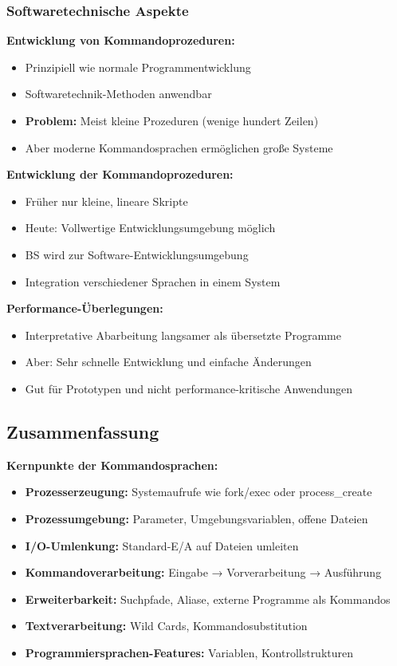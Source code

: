 \documentclass[9pt,a4paper]{extarticle}
\begin{document}
\begin{multicols*}{2}
\subsubsection{Softwaretechnische Aspekte}
\textbf{Entwicklung von Kommandoprozeduren:}
\begin{itemize}
\item Prinzipiell wie normale Programmentwicklung
\item Softwaretechnik-Methoden anwendbar
\item \textbf{Problem:} Meist kleine Prozeduren (wenige hundert Zeilen)
\item Aber moderne Kommandosprachen ermöglichen große Systeme
\end{itemize}

\textbf{Entwicklung der Kommandoprozeduren:}
\begin{itemize}
\item Früher nur kleine, lineare Skripte
\item Heute: Vollwertige Entwicklungsumgebung möglich
\item BS wird zur Software-Entwicklungsumgebung
\item Integration verschiedener Sprachen in einem System
\end{itemize}

\textbf{Performance-Überlegungen:}
\begin{itemize}
\item Interpretative Abarbeitung langsamer als übersetzte Programme
\item Aber: Sehr schnelle Entwicklung und einfache Änderungen
\item Gut für Prototypen und nicht performance-kritische Anwendungen
\end{itemize}

\subsection{Zusammenfassung}
\textbf{Kernpunkte der Kommandosprachen:}
\begin{itemize}
\item \textbf{Prozesserzeugung:} Systemaufrufe wie fork/exec oder process\_create
\item \textbf{Prozessumgebung:} Parameter, Umgebungsvariablen, offene Dateien
\item \textbf{I/O-Umlenkung:} Standard-E/A auf Dateien umleiten
\item \textbf{Kommandoverarbeitung:} Eingabe → Vorverarbeitung → Ausführung
\item \textbf{Erweiterbarkeit:} Suchpfade, Aliase, externe Programme als Kommandos
\item \textbf{Textverarbeitung:} Wild Cards, Kommandosubstitution
\item \textbf{Programmiersprachen-Features:} Variablen, Kontrollstrukturen
\end{itemize}


\end{multicols*}
\end{document}
